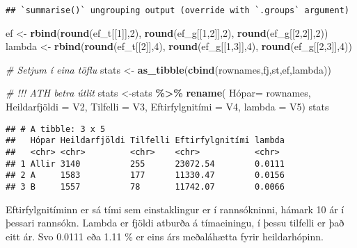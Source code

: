 \documentclass[
]{book}
\newenvironment{Shaded}{\begin{snugshade}}{\end{snugshade}}
\newcommand{\CommentTok}[1]{\textcolor[rgb]{0.56,0.35,0.01}{\textit{#1}}}
\newcommand{\DataTypeTok}[1]{\textcolor[rgb]{0.13,0.29,0.53}{#1}}
\newcommand{\DecValTok}[1]{\textcolor[rgb]{0.00,0.00,0.81}{#1}}
\newcommand{\KeywordTok}[1]{\textcolor[rgb]{0.13,0.29,0.53}{\textbf{#1}}}
\newcommand{\NormalTok}[1]{#1}
\newcommand{\OperatorTok}[1]{\textcolor[rgb]{0.81,0.36,0.00}{\textbf{#1}}}
\newcommand{\StringTok}[1]{\textcolor[rgb]{0.31,0.60,0.02}{#1}}
\begin{document}
\begin{verbatim}
## `summarise()` ungrouping output (override with `.groups` argument)
\end{verbatim}

\begin{Shaded}
\begin{Highlighting}[]
\NormalTok{ef <{-}}\StringTok{ }\KeywordTok{rbind}\NormalTok{(}\KeywordTok{round}\NormalTok{(ef\_t[[}\DecValTok{1}\NormalTok{]],}\DecValTok{2}\NormalTok{), }\KeywordTok{round}\NormalTok{(ef\_g[[}\DecValTok{1}\NormalTok{,}\DecValTok{2}\NormalTok{]],}\DecValTok{2}\NormalTok{), }\KeywordTok{round}\NormalTok{(ef\_g[[}\DecValTok{2}\NormalTok{,}\DecValTok{2}\NormalTok{]],}\DecValTok{2}\NormalTok{))}
\NormalTok{lambda <{-}}\StringTok{ }\KeywordTok{rbind}\NormalTok{(}\KeywordTok{round}\NormalTok{(ef\_t[[}\DecValTok{2}\NormalTok{]],}\DecValTok{4}\NormalTok{), }\KeywordTok{round}\NormalTok{(ef\_g[[}\DecValTok{1}\NormalTok{,}\DecValTok{3}\NormalTok{]],}\DecValTok{4}\NormalTok{), }\KeywordTok{round}\NormalTok{(ef\_g[[}\DecValTok{2}\NormalTok{,}\DecValTok{3}\NormalTok{]],}\DecValTok{4}\NormalTok{))}

\CommentTok{\# Setjum í eina töflu}
\NormalTok{stats <{-}}\StringTok{ }\KeywordTok{as\_tibble}\NormalTok{(}\KeywordTok{cbind}\NormalTok{(rownames,fj,st,ef,lambda))}

\CommentTok{\# !!! ATH betra útlit}
\NormalTok{stats <{-}stats }\OperatorTok{\%>\%}\StringTok{ }\KeywordTok{rename}\NormalTok{( Hópar=}\StringTok{ }\NormalTok{rownames, Heildarfjöldi =}\StringTok{ }\NormalTok{V2,  }\DataTypeTok{Tilfelli =}\NormalTok{ V3, Eftirfylgnitími =}\StringTok{ }\NormalTok{V4, }\DataTypeTok{lambda =}\NormalTok{ V5)}
\NormalTok{stats}
\end{Highlighting}
\end{Shaded}

\begin{verbatim}
## # A tibble: 3 x 5
##   Hópar Heildarfjöldi Tilfelli Eftirfylgnitími lambda
##   <chr> <chr>         <chr>    <chr>           <chr> 
## 1 Allir 3140          255      23072.54        0.0111
## 2 A     1583          177      11330.47        0.0156
## 3 B     1557          78       11742.07        0.0066
\end{verbatim}

Eftirfylgnitíminn er sá tími sem einstaklingur er í rannsókninni, hámark 10 ár í þessari rannsókn. Lambda er fjöldi atburða á tímaeiningu, í þessu tilfelli er það eitt ár. Svo 0.0111 eða 1.11 \% er eins árs meðaláhætta fyrir heildarhópinn.
\end{document}
